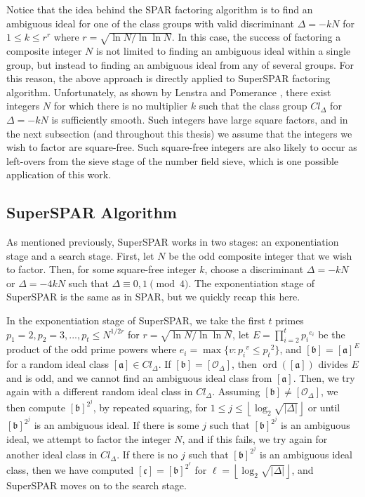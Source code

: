 \documentclass{ucalgthes1}
\theoremstyle{definition}
\DeclareMathOperator{\ord}{ord}
\newcommand{\floor}[1]{\left\lfloor #1 \right\rfloor}
\newcommand{\ideal}{\mathfrak}
\newcommand{\idealclass}[1]{\left[ \ideal #1 \right]}
\newcommand{\aclass}{\idealclass a}
\newcommand{\bclass}{\idealclass b}
\newcommand{\cclass}{\idealclass c}
\newcommand{\idclass}{[\mathcal O_\Delta]}
\begin{document}
Notice that the idea behind the SPAR factoring algorithm is to find an ambiguous ideal for one of the class groups with valid discriminant $\Delta = -kN$ for $1 \le k \le r^r$ where $r = \sqrt{\ln N / \ln \ln N}$.  In this case, the success of factoring a composite integer $N$ is not limited to finding an ambiguous ideal within a single group, but instead to finding an ambiguous ideal from any of several groups.  For this reason, the above approach is directly applied to SuperSPAR factoring algorithm.  Unfortunately, as shown by Lenstra and Pomerance \mbox{\cite[\S~11]{Lenstra1992}}, there exist integers $N$ for which there is no multiplier $k$ such that the class group $Cl_\Delta$ for $\Delta = -kN$ is sufficiently smooth.  Such integers have large square factors, and in the next subsection (and throughout this thesis) we assume that the integers we wish to factor are square-free.  Such square-free integers are also likely to occur as left-overs from the sieve stage of the number field sieve, which is one possible application of this work.


\subsection{SuperSPAR Algorithm}
\label{subsec:ssparAlg}

As mentioned previously, SuperSPAR works in two stages: an exponentiation stage and a search stage.  First, let $N$ be the odd composite integer that we wish to factor.  Then, for some square-free integer $k$, choose a discriminant $\Delta = -kN$ or $\Delta = -4kN$ such that $\Delta \equiv 0, 1 \pmod 4$.  The exponentiation stage of SuperSPAR is the same as in SPAR, but we quickly recap this here.

In the exponentiation stage of SuperSPAR, we take the first $t$ primes $p_1 = 2, p_2 = 3, ..., p_t \le N^{1/2r}$ for $r = \sqrt{\ln N / \ln \ln N}$, let $E = \prod_{i=2}^t {p_i}^{e_i}$ be the product of the odd prime powers where $e_i = \max \{ v : {p_i}^v \le {p_t}^2 \}$, and $\bclass = \aclass^E$ for a random ideal class $\aclass \in Cl_\Delta$.  If $\bclass = \idclass$, then $\ord(\aclass)$ divides $E$ and is odd, and we cannot find an ambiguous ideal class from $\aclass$.  Then, we try again with a different random ideal class in $Cl_\Delta$.  Assuming $\bclass \neq \idclass$, we then compute $\bclass^{2^j}$, by repeated squaring, for $1 \le j \le \floor{\log_2\sqrt{|\Delta|}}$ or until $\bclass^{2^j}$ is an ambiguous ideal.  If there is some $j$ such that $\bclass^{2^j}$ is an ambiguous ideal, we attempt to factor the integer $N$, and if this fails, we try again for another ideal class in $Cl_\Delta$.  If there is no $j$ such that $\bclass^{2^j}$ is an ambiguous ideal class, then we have computed $\cclass = {\bclass}^{2^\ell}$ for $\ell=\floor{\log_2 \sqrt{|\Delta|}}$, and SuperSPAR moves on to the search stage.
\end{document}
